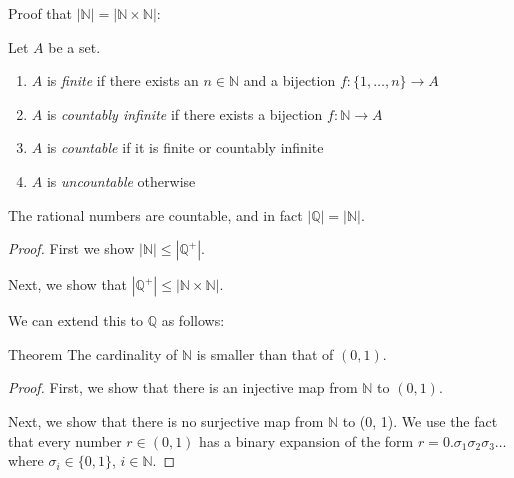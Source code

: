 \documentclass [aspectratio=169]{beamer}
\newcommand{\N}{{\mathbb{N}}}
\newcommand{\Q}{{\mathbb{Q}}}
\begin{document}
\begin{frame}
Proof that $|\N| = |\N \times \N|$:
\vspace{6cm}
\end{frame}

\begin{frame}
\begin{definition}
Let $A$ be a set. 
\vspace{0.25em}
\begin{enumerate}
\setlength\itemsep{0.5em}
\item $A$ is \emph{finite} if there exists an $n \in \N$ and a bijection $f:\{1,\ldots,n\} \to A$
\item $A$ is \emph{countably infinite} if there exists a bijection $f:\N\to A$
\item $A$ is \emph{countable} if it is finite or countably infinite
\item $A$ is \emph{uncountable} otherwise
\end{enumerate}
\end{definition}
\end{frame}

\begin{frame}
\begin{example}
The rational numbers are countable, and in fact $|\Q| = |\N|$.
\end{example}

\vspace{0.5em}

\textit{Proof.}
First we show $|\N| \leq |\Q^+|$.
\vspace{4.5cm}

\end{frame}

\begin{frame}
Next, we show that $|\Q^+| \leq |\N \times \N|$.

\vspace{5.5cm}


\end{frame}

\begin{frame}
We can extend this to $\Q$ as follows:
\vspace{5.5cm}


\end{frame}

\begin{frame}
\begin{alertblock}{Theorem}
The cardinality of $\N$ is smaller than that of $(0,1)$.
\end{alertblock}
\begin{proof}
First, we show that there is an injective map from $\N$ to $(0, 1)$.

\vspace{3em} 

Next, we show that there is no surjective map from $\N$ to (0, 1). We use the fact that every number $r \in (0,1)$ has a binary expansion of the form $r=0.\sigma_1\sigma_2\sigma_3\ldots$ where $\sigma_i \in \{0, 1\}$, $i \in \N$.
\end{proof}
\end{frame}
\end{document}
